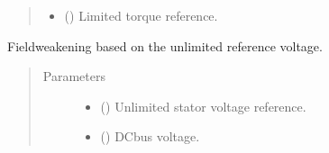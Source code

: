\documentclass[letterpaper,10pt,english]{sphinxmanual}
\begin{document}
\begin{fulllineitems}
\begin{fulllineitems}
\begin{quote}
\begin{description}
\begin{itemize}
\item {} 
\sphinxAtStartPar
{} () \textendash{} Limited torque reference.

\end{itemize}


\end{description}\end{quote}

\end{fulllineitems}


\begin{fulllineitems}
\label{\detokenize{control.im:control.im.vector.CurrentRef.update}}
\pysigstartsignatures
{}
\pysigstopsignatures
\sphinxAtStartPar
Field\sphinxhyphen{}weakening based on the unlimited reference voltage.
\begin{quote}\begin{description}
\item[{Parameters}] \leavevmode\begin{itemize}
\item {} 
\sphinxAtStartPar
{} () \textendash{} Unlimited stator voltage reference.

\item {} 
\sphinxAtStartPar
{} () \textendash{} DC\sphinxhyphen{}bus voltage.

\end{itemize}

\end{description}\end{quote}

\end{fulllineitems}


\end{fulllineitems}

\end{document}
